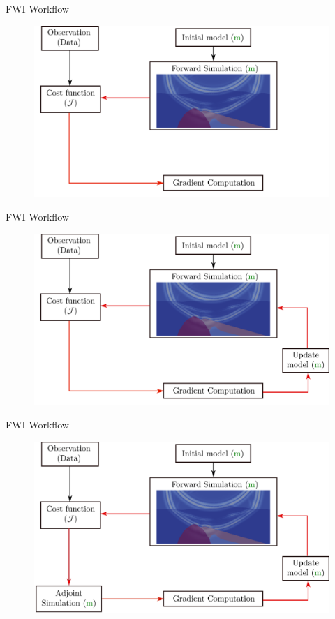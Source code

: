 \begin{frame}[noframenumbering]{FWI Workflow}
\begin{figure}
  \includegraphics[scale=0.31]{image/fwi_workflow_grad1.pdf}
\end{figure}
\end{frame}

\begin{frame}[noframenumbering]{FWI Workflow}
\begin{figure}
  \includegraphics[scale=0.31]{image/fwi_workflow_grad.pdf}
\end{figure}
\end{frame}

\begin{frame}[noframenumbering]{FWI Workflow}
\begin{figure}
  \includegraphics[scale=0.31]{image/fwi_workflow.pdf}
\end{figure}
\end{frame}

